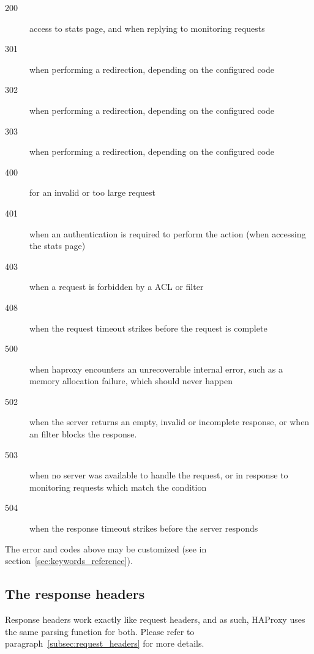\begin{description}
\item[200] access to stats page, and when replying to monitoring requests
\item[301] when performing a redirection, depending on the configured code
\item[302] when performing a redirection, depending on the configured code
\item[303] when performing a redirection, depending on the configured code
\item[400] for an invalid or too large request
\item[401] when an authentication is required to perform the action (when
        accessing the stats page)
\item[403] when a request is forbidden by a  ACL or  filter
\item[408] when the request timeout strikes before the request is complete
\item[500] when haproxy encounters an unrecoverable internal error, such as a
        memory allocation failure, which should never happen
\item[502] when the server returns an empty, invalid or incomplete response, or
        when an  filter blocks the response.
\item[503] when no server was available to handle the request, or in response to
        monitoring requests which match the  condition
\item[504] when the response timeout strikes before the server responds
\end{description}

The error  and  codes above may be customized (see  in section~\ref{sec:keywords_reference}).

\subsection{The response headers}
\label{subsec:response_header}

Response headers work exactly like request headers, and as such, HAProxy uses
the same parsing function for both. Please refer to paragraph~\ref{subsec:request_headers} for more
details.
